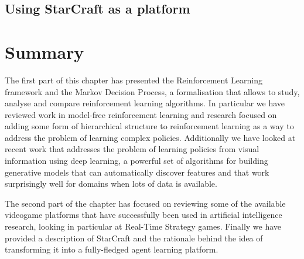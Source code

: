 \subsection{Using StarCraft as a platform}

\section{Summary}

The first part of this chapter has presented the Reinforcement Learning
framework and the Markov Decision Process, a formalisation that allows to study,
analyse and compare reinforcement learning algorithms. In particular we have
reviewed work in model-free reinforcement learning and research focused on
adding some form of hierarchical structure to reinforcement learning as a way to
address the problem of learning complex policies. Additionally we have looked at
recent work that addresses the problem of learning policies from visual
information using deep learning, a powerful set of algorithms for building
generative models that can automatically discover features and that work
surprisingly well for domains when lots of data is available.

The second part of the chapter has focused on reviewing some of the available
videogame platforms that have successfully been used in artificial intelligence
research, looking in particular at Real-Time Strategy games. Finally we have
provided a description of StarCraft and the rationale behind the idea of
transforming it into a fully-fledged agent learning platform.
